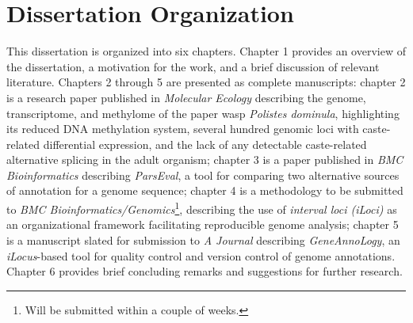 \section{Dissertation Organization}

This dissertation is organized into six chapters.
Chapter 1 provides an overview of the dissertation, a motivation for the work, and a brief discussion of relevant literature.
Chapters 2 through 5 are presented as complete manuscripts:
chapter 2 is a research paper published in \textit{Molecular Ecology} describing the genome, transcriptome, and methylome of the paper wasp \textit{Polistes dominula}, highlighting its reduced DNA methylation system, several hundred genomic loci with caste-related differential expression, and the lack of any detectable caste-related alternative splicing in the adult organism;
chapter 3 is a paper published in \textit{BMC Bioinformatics} describing \textit{ParsEval}, a tool for comparing two alternative sources of annotation for a genome sequence;
chapter 4 is a methodology to be submitted to \textit{BMC Bioinformatics/Genomics}\footnote{Will be submitted within a couple of weeks.}, describing the use of \textit{interval loci (iLoci)} as an organizational framework facilitating reproducible genome analysis;
chapter 5 is a manuscript slated for submission to \textit{A Journal} describing \textit{GeneAnnoLogy}, an \textit{iLocus}-based tool for quality control and version control of genome annotations.
Chapter 6 provides brief concluding remarks and suggestions for further research.
